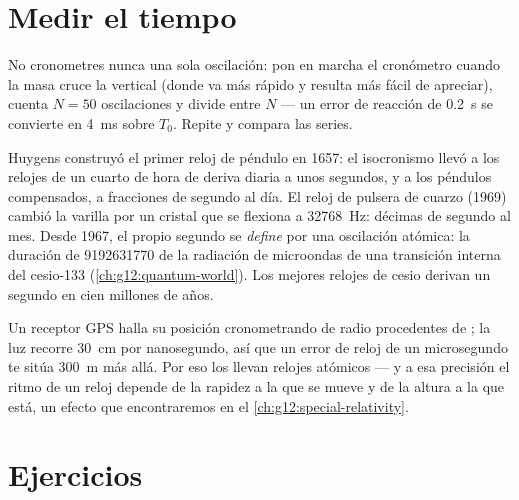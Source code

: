 \section{Medir el tiempo}

\begin{method}\label{met:g12:oscillators-and-time:timing}
No cronometres nunca una sola oscilación: pon en marcha el cronómetro cuando la masa
cruce la vertical (donde va más rápido y resulta más fácil de apreciar), cuenta
$N = 50$ oscilaciones y divide entre $N$ --- un error de reacción de \qty{0.2}{s} se
convierte en \qty{4}{ms} sobre $T_0$. Repite y compara las series.
\end{method}

\begin{example}\label{ex:g12:oscillators-and-time:clocks}
Huygens construyó el primer reloj de péndulo en \num{1657}: el isocronismo llevó a los
relojes de un cuarto de hora de deriva diaria a unos segundos, y a los péndulos
compensados, a fracciones de segundo al día. El reloj de pulsera de cuarzo
(\num{1969}) cambió la varilla por un cristal que se flexiona a \qty{32768}{Hz}:
décimas de segundo al mes. Desde \num{1967}, el propio segundo se \emph{define} por
una oscilación atómica: la duración de \num{9192631770}  de la radiación de
microondas de una transición interna del cesio-133
(\cref{ch:g12:quantum-world}). Los mejores relojes de cesio derivan un segundo en cien
millones de años.
\end{example}

\begin{remark}\label{rem:g12:oscillators-and-time:gps}
Un receptor GPS halla su posición cronometrando  de radio procedentes de
; la luz recorre \qty{30}{cm} por nanosegundo, así que un error de reloj de
un microsegundo te sitúa \qty{300}{m} más allá. Por eso los  llevan relojes
atómicos --- y a esa precisión el ritmo de un reloj depende de la rapidez a la que se
mueve y de la altura a la que está, un efecto que encontraremos en el
\cref{ch:g12:special-relativity}.
\end{remark}

\section{Ejercicios}

